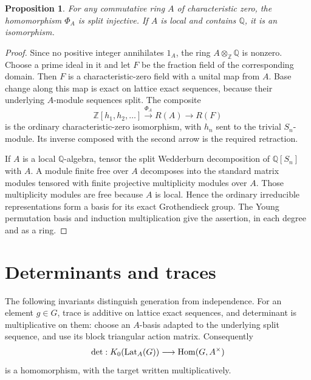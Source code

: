 \documentclass[11pt,a4paper]{article}
\newtheorem{proposition}[theorem]{Proposition}
\theoremstyle{definition}\newtheorem{definition}[theorem]{Definition}
\theoremstyle{remark}\newtheorem{remark}[theorem]{Remark}
\newcommand{\Z}{\mathbb Z}\newcommand{\Q}{\mathbb Q}
\begin{document}
\begin{proposition}\label{prop:split-injection}
For any commutative ring $A$ of characteristic zero, the homomorphism
$\Phi_A$ is split injective.  If $A$ is local and contains $\Q$,
it is an isomorphism.
\end{proposition}
\begin{proof}
Since no positive integer annihilates $1_A$, the ring
$A\otimes_\Z\Q$ is nonzero.  Choose a prime ideal in it and let
$F$ be the fraction field of the corresponding domain.  Then
$F$ is a characteristic-zero field with a unital map from $A$.
Base change along this map is exact on lattice exact sequences,
because their underlying $A$-module sequences split.  The composite
\[
 \Z[h_1,h_2,\ldots]\xrightarrow{\Phi_A}R(A)
           \longrightarrow R(F)
\]
is the ordinary characteristic-zero isomorphism, with $h_n$ sent
to the trivial $S_n$-module.  Its inverse composed with the second
arrow is the required retraction.

If $A$ is a local $\Q$-algebra, tensor the split Wedderburn
decomposition of $\Q[S_n]$ with $A$.  A module finite free over
$A$ decomposes into the standard matrix modules tensored with
finite projective multiplicity modules over $A$.  Those
multiplicity modules are free because $A$ is local.  Hence the
ordinary irreducible representations form a basis for its exact
Grothendieck group.  The Young permutation basis and induction
multiplication give the assertion, in each degree and as a ring.
\end{proof}






\section{Determinants and traces}

The following invariants distinguish generation from independence.
For an element $g\in G$, trace is additive on lattice exact
sequences, and determinant is multiplicative on them: choose an
$A$-basis adapted to the underlying split sequence, and use its
block triangular action matrix.  Consequently
\[
 \det:K_0(\operatorname{Lat}_A(G))\longrightarrow\operatorname{Hom}(G,A^\times)
\]
is a homomorphism, with the target written multiplicatively.
\end{document}
